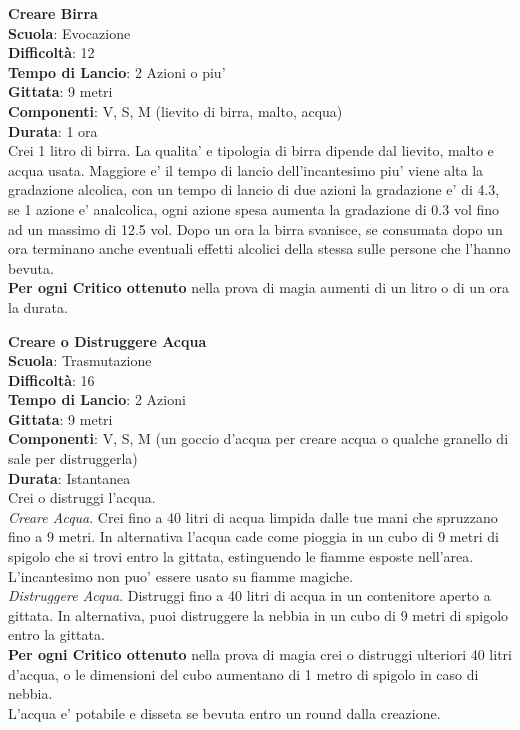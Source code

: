 \begin{multicols}{2}
\medskip\textbf{Creare Birra}\\
\textbf{Scuola}: Evocazione\\
\textbf{Difficoltà}: 12\\
\textbf{Tempo di Lancio}: 2 Azioni o piu'\\
\textbf{Gittata}: 9 metri\\
\textbf{Componenti}: V, S, M (lievito di birra, malto, acqua)\\
\textbf{Durata}: 1 ora\\
Crei 1 litro di birra. La qualita' e tipologia di birra dipende dal lievito, malto e acqua usata.
Maggiore e' il tempo di lancio dell'incantesimo piu' viene alta la gradazione alcolica, con un tempo di lancio di due azioni la gradazione e' di 4.3, se 1 azione e' analcolica, ogni azione spesa aumenta la gradazione di 0.3 vol fino ad un massimo di 12.5 vol.
Dopo un ora la birra svanisce, se consumata dopo un ora terminano anche eventuali effetti alcolici della stessa sulle persone che l'hanno bevuta.\\
\textbf{Per ogni Critico ottenuto} nella prova di magia aumenti di un litro o di un ora la durata.

\medskip\textbf{Creare o Distruggere Acqua}\\
\textbf{Scuola}: Trasmutazione\\
\textbf{Difficoltà}: 16\\
\textbf{Tempo di Lancio}: 2 Azioni\\
\textbf{Gittata}: 9 metri\\
\textbf{Componenti}: V, S, M (un goccio d'acqua per creare acqua o qualche granello di sale per distruggerla)\\
\textbf{Durata}: Istantanea\\
Crei o distruggi l'acqua.\\
\textit{Creare Acqua}. Crei fino a 40 litri di acqua limpida dalle tue mani che spruzzano fino a 9 metri. In alternativa l'acqua cade come pioggia in un cubo di 9 metri di spigolo che si trovi entro la gittata, estinguendo le fiamme esposte nell'area.\\
L'incantesimo non puo' essere usato su fiamme magiche.\\
\textit{Distruggere Acqua}. Distruggi fino a 40 litri di acqua in un contenitore aperto a gittata. In alternativa, puoi distruggere la nebbia in un cubo di 9 metri di spigolo entro la gittata.\\
\textbf{Per ogni Critico ottenuto} nella prova di magia crei o distruggi ulteriori 40 litri d'acqua, o le dimensioni del cubo aumentano di 1 metro di spigolo in caso di nebbia.\\
L'acqua e' potabile e disseta se bevuta entro un round dalla creazione.


\end{multicols}

